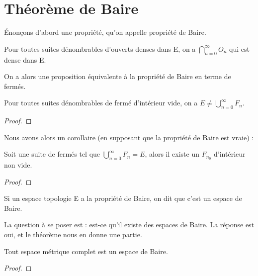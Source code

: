 \section{Théorème de Baire}

Énonçons d'abord une propriété, qu'on appelle propriété de Baire.

\begin{propriete} 
	Pour toutes suites dénombrables d'ouverts denses dans E, on a $\displaystyle
	\bigcap_{n = 0}^{\infty} O_{n}$ qui est dense dans E.
\end{propriete}

On a alors une proposition équivalente à la propriété de Baire en terme de
fermés.

\begin{propriete} 
	Pour toutes suites dénombrables de fermé d'intérieur vide, on a $E \neq
	\displaystyle \bigcup_{n = 0}^{\infty} F_{n}$.
\end{propriete}

\begin{proof}
	
\end{proof}

Nous avons alors un corollaire (en supposant que la propriété de Baire est
vraie) :

\begin{corollary}
	Soit une suite  de fermés tel que $\displaystyle
	\bigcup_{n = 0}^{\infty}{F_{n}} = E$, alors il existe un $F_{n_{0}}$
	d'intérieur non vide.
\end{corollary}

\begin{proof}
	
\end{proof}

\begin{definition} 
	Si un espace topologie E a la propriété de Baire, on dit que c'est un espace
	de Baire.
\end{definition}

La question à se poser est : est-ce qu'il existe des espaces de Baire. La
réponse est oui, et le théorème nous en donne une partie.

\begin{theorem} 
	Tout espace métrique complet est un espace de Baire.
\end{theorem}

\begin{proof}
	
\end{proof}

